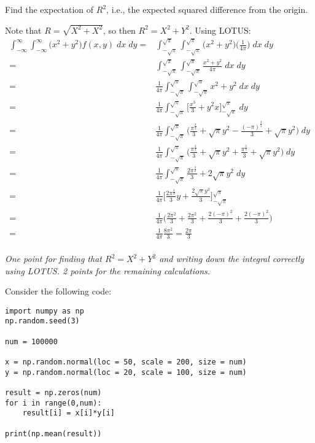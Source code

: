 \begin{exercise}[3]
Find the expectation of $R^2$, i.e., the expected squared difference from the origin.
\begin{solution}
Note that $R = \sqrt{X^2 + X^2}$, so then $R^2 = X^2 + Y^2$. Using LOTUS:
\begin{align*}
      \int_{-\infty}^\infty \int_{-\infty}^\infty \Big(x^2 + y^2 \Big) f(x,y) \; dx \; dy =& \int_{-\sqrt{\pi}}^{\sqrt{\pi}} \int_{-\sqrt{\pi}}^{\sqrt{\pi}}  \Big(x^2 + y^2 \Big) \Big(\frac{1}{4\pi} \Big) \; dx \; dy \\
      =& \int_{-\sqrt{\pi}}^{\sqrt{\pi}} \int_{-\sqrt{\pi}}^{\sqrt{\pi}} \frac{x^2 + y^2}{4\pi} \; dx \; dy \\
      =& \frac{1}{4\pi} \int_{-\sqrt{\pi}}^{\sqrt{\pi}} \int_{-\sqrt{\pi}}^{\sqrt{\pi}} x^2 + y^2 \; dx \; dy \\
      =& \frac{1}{4\pi} \int_{-\sqrt{\pi}}^{\sqrt{\pi}} \Big[\frac{x^3}{3} + y^2x \Big]_{-\sqrt{\pi}}^{\sqrt{\pi}} \; dy \\
      =& \frac{1}{4\pi} \int_{-\sqrt{\pi}}^{\sqrt{\pi}} \Big( \frac{\pi^{\frac{3}{2}}}{3} + \sqrt{\pi}y^2 - \frac{(-\pi)^{\frac{3}{2}}}{3} + \sqrt{\pi}y^2 \Big)\; dy \\
        =& \frac{1}{4\pi} \int_{-\sqrt{\pi}}^{\sqrt{\pi}} \Big( \frac{\pi^{\frac{3}{2}}}{3} + \sqrt{\pi}y^2 + \frac{\pi^{\frac{3}{2}}}{3} + \sqrt{\pi}y^2 \Big)\; dy \\
        =& \frac{1}{4\pi} \int_{-\sqrt{\pi}}^{\sqrt{\pi}} \frac{2\pi^{\frac{3}{2}}}{3} + 2\sqrt{\pi}y^2 \; dy \\
        =& \frac{1}{4\pi} \Big[ \frac{2\pi^{\frac{3}{2}}}{3}y + \frac{2\sqrt{\pi}y^3}{3} \Big]_{-\sqrt{\pi}}^{\sqrt{\pi}}\\
        =& \frac{1}{4\pi} \Big( \frac{2 \pi^2}{3} + \frac{2 \pi^2}{3} + \frac{2 (-\pi)^2}{3} + \frac{2 (-\pi)^2}{3} \Big) \\
        =& \frac{1}{4\pi} \frac{8 \pi^2}{3} = \frac{2 \pi}{3}
\end{align*} \\
\textit{One point for finding that $R^2 = X^2 + Y^2$ and writing down the integral correctly using LOTUS. 2 points for the remaining calculations.}
\end{solution}
\end{exercise}
\noindent
Consider the following code:
\begin{verbatim}
import numpy as np
np.random.seed(3)

num = 100000

x = np.random.normal(loc = 50, scale = 200, size = num)
y = np.random.normal(loc = 20, scale = 100, size = num)

result = np.zeros(num)
for i in range(0,num):
    result[i] = x[i]*y[i]

print(np.mean(result))
\end{verbatim}

